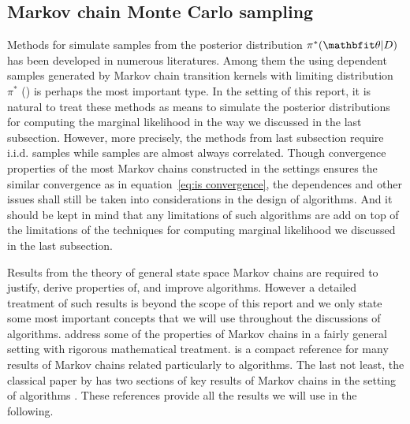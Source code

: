 \subsection{Markov chain Monte Carlo sampling}
\label{sub:Markov chain Monte Carlo sampling}

Methods for simulate samples from the posterior distribution $\pi^*(\bth|D)$
has been developed in numerous literatures. Among them the using dependent
samples generated by Markov chain transition kernels with limiting
distribution $\pi^*$ (\mcmc) is perhaps the most important type. In the
setting of this report, it is natural to treat these methods as means to
simulate the posterior distributions for computing the marginal likelihood in
the way we discussed in the last subsection. However, more precisely, the
methods from last subsection require i.i.d. samples while \mcmc samples are
almost always correlated. Though convergence properties of the most Markov
chains constructed in the \mcmc settings ensures the similar convergence as in
equation~\eqref{eq:is convergence}, the dependences and other issues shall
still be taken into considerations in the design of \mcmc algorithms. And it
should be kept in mind that any limitations of such algorithms are add on top
of the limitations of the techniques for computing marginal likelihood we
discussed in the last subsection.

Results from the theory of general state space Markov chains are required to
justify, derive properties of, and improve \mcmc algorithms. However a
detailed treatment of such results is beyond the scope of this report and we
only state some most important concepts that we will use throughout the
discussions of algorithms.  \textcite[][chap.~6 and~7]{Durrett2010} address
some of the properties of Markov chains in a fairly general setting with
rigorous mathematical treatment. \textcite[][chap.~6]{Robert2004} is a compact
reference for many results of Markov chains related particularly to \mcmc
algorithms. The last not least, the classical paper by \textcite{Tierney1994}
has two sections of key results of Markov chains in the setting of \mcmc
algorithms \parencites(also see)(for discussions of results in this
paper){Besag1994,Chan1994,Doss1994,Robert1994}. These references provide all
the results we will use in the following.

